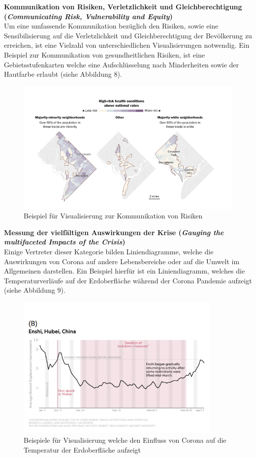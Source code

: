 \documentclass[12pt, oneside]{article}
\begin{document}
\clearpage
\textbf{Kommunikation von Risiken, Verletzlichkeit und Gleichberechtigung (\textit{Communicating Risk, Vulnerability and Equity})}\\
Um eine umfassende Kommunikation bezüglich den Risiken, sowie eine Sensibilisierung auf die Verletzlichkeit und Gleichberechtigung der Bevölkerung zu erreichen, ist eine Vielzahl von unterschiedlichen Visualisierungen notwendig. Ein Beispiel zur Kommunikation von gesundheitlichen Risiken, ist eine Gebietsstufenkarten welche eine Aufschlüsselung nach Minderheiten sowie der Hautfarbe erlaubt (siehe Abbildung 8).


\begin{figure}[ht]
	\includegraphics[width=12cm]{images/communicating_equity_visualizations.png}
	\centering
	\caption{Beispiel für Visualisierung zur Kommunikation von Risiken  ~\citep[S. 12]{YixuanZhang.}}
\end{figure}

\clearpage
\textbf{Messung der vielfältigen Auswirkungen der Krise (\textit{Gauging the multifaceted Impacts of the Crisis})}\\
Einige Vertreter dieser Kategorie bilden Liniendiagramme, welche die Auswirkungen von Corona auf andere Lebensbereiche oder auf die Umwelt im Allgemeinen darstellen. Ein Beispiel hierfür ist ein Liniendiagramm, welches die Temperaturverläufe auf der Erdoberfläche während der Corona Pandemie aufzeigt (siehe Abbildung 9).

\begin{figure}[ht]
	\includegraphics[width=10cm]{images/measure_multifaceted_impact_visualizations.png}
	\centering
	\caption{Beispiele für Visualisierung welche den Einfluss von Corona auf die Temperatur der Erdoberfläche aufzeigt ~\citep[S. 14]{YixuanZhang.}}
\end{figure}
\end{document}
